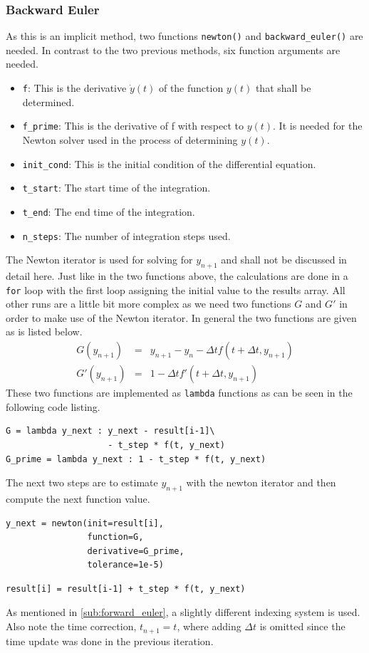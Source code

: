 \documentclass{aa}
\begin{document}
\subsubsection*{Backward Euler}%
\label{ssub:backward_euler}
As this is an implicit method, two functions \verb+newton()+ and \verb+backward_euler()+ are
needed. In contrast to the two previous methods, six function arguments are needed. 
\begin{itemize}
    \item \verb+f+: This is the derivative \(\dot{y}(t)\) of the function \(y(t)\) that shall
        be determined.
    \item \verb+f_prime+: This is the derivative of f with respect to \(y(t)\). It is needed
        for the Newton solver used in the process of determining \(y(t)\).
    \item \verb+init_cond+: This is the initial condition of the differential equation.
    \item \verb+t_start+: The start time of the integration.
    \item \verb+t_end+: The end time of the integration.
    \item \verb+n_steps+: The number of integration steps used.
\end{itemize}
The Newton iterator is used for solving for \(y_{n+1}\) and shall not be discussed in detail
here. Just like in the two functions above, the calculations are done in a \verb+for+ loop with
the first loop assigning the initial value to the results array. All other runs are a little
bit more complex as we need two functions \(G\) and \(G'\) in order to make use of the Newton
iterator. In general the two functions are given as is listed below.
\begin{eqnarray}
    \label{equ:g_funcs}
    G(y_{n+1}) & = & y_{n+1} - y_n - \Delta t f(t + \Delta t, y_{n+1}) \\ \label{equ:g_prime}
    G'(y_{n+1}) & = & 1 - \Delta t f'(t + \Delta t, y_{n+1})
\end{eqnarray}
These two functions are implemented as \verb+lambda+ functions as can be seen in the following
code listing.
\begin{lstlisting}[firstnumber=329, name=ode_solvers]
G = lambda y_next : y_next - result[i-1]\
                    - t_step * f(t, y_next)
G_prime = lambda y_next : 1 - t_step * f(t, y_next)
\end{lstlisting}
The next two steps are to estimate \(y_{n+1}\) with the newton iterator and then compute the
next function value.
\begin{lstlisting}[firstnumber=338, name=ode_solvers]
y_next = newton(init=result[i],
                function=G,
                derivative=G_prime,
                tolerance=1e-5)
\end{lstlisting}
\begin{lstlisting}[firstnumber=346, name=ode_solvers]
    result[i] = result[i-1] + t_step * f(t, y_next)
\end{lstlisting}
As mentioned in \ref{sub:forward_euler}, a slightly different indexing system is used. Also
note the time correction, \(t_{n+1}=t\), where adding \(\Delta t\) is omitted since the time
update was done in the previous iteration. 
\end{document}
